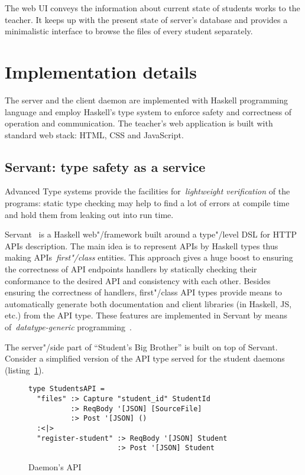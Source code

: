 The web UI conveys the information about current state of students works to the teacher.
It keeps up with the present state of server's database and provides a minimalistic
interface to browse the files of every student separately.

\section{Implementation details}

The server and the client daemon are implemented with Haskell programming language
and employ Haskell's type system to enforce safety and correctness of operation
and communication. The teacher's web application is built with standard web stack:
HTML, CSS and JavaScript.

\subsection{Servant: type safety as a service}

Advanced Type systems provide the facilities for~\emph{lightweight verification}
of the programs: static type checking may help to find a lot of errors at compile
time and hold them from leaking out into run time.

Servant~\cite{Mestanogullari:2015:TWA:2808098.2808099} is a Haskell web"/framework built
around a type"/level DSL for HTTP APIs description. The main idea is to represent
APIs by Haskell types thus making APIs~\emph{first"/class} entities. This approach
gives a huge boost to ensuring the correctness of API endpoints handlers by statically
checking their conformance to the desired API and consistency with each other.
Besides ensuring the correctness of handlers, first"/class API types provide
means to automatically generate both documentation and client libraries (in Haskell,
JS, etc.) from the API type. These features are implemented in Servant by
means of~\emph{datatype-generic} programming~\cite{DBLP:conf/mpc/HoldermansJLR06}.

The server"/side part of ``Student's Big Brother'' is built on top of Servant. Consider a
simplified version of the API type served for the student daemons
(listing~\ref{listing:daemonAPI}).

\begin{figure}[h]
\begin{lstlisting}
type StudentsAPI =
  "files" :> Capture "student_id" StudentId
          :> ReqBody '[JSON] [SourceFile]
          :> Post '[JSON] ()
  :<|>
  "register-student" :> ReqBody '[JSON] Student
                     :> Post '[JSON] Student
\end{lstlisting}
\caption{Daemon's API}
\label{listing:daemonAPI}
\end{figure}

